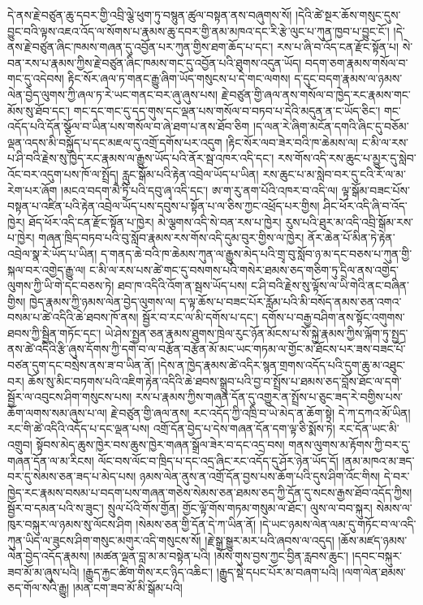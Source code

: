 \documentclass{article}
\begin{document}
དེ་ནས་རྗེ་བཙུན་ཆུ་དབར་གྱི་འབྲི་ལྕེ་ཕུག་ཏུ་བསྙུན་ཚུལ་བསྟན་ནས་བཞུགས་སོ། །དེའི་ཚེ་སྔར་ཆོས་གསུང་དུས་བྱུང་བའི་ལྟས་འཇའ་འོད་ལ་སོགས་པ་རྣམས་ཆུ་དབར་གྱི་ནམ་མཁའ་དང་རི་རྩེ་ལུང་པ་ཀུན་ཁྱབ་པ་བྱུང་ངོ་། །དེ་ནས་རྗེ་བཙུན་ཞིང་ཁམས་གཞན་དུ་འབྱོན་པར་ཀུན་གྱིས་ཐག་ཆོད་པ་དང་། རས་པ་ཞི་བ་འོད་ངན་རྫོང་སྟོན་པ། སེ་བན་རས་པ་རྣམས་ཀྱིས་རྗེ་བཙུན་ཞིང་ཁམས་གང་དུ་འབྱོན་པའི་ཐུགས་འདུན་ཡོད། བདག་ཅག་རྣམས་གསོལ་བ་གང་དུ་འདེབས། རྟིང་སོར་ཞལ་ཏ་གནང་རྒྱུ་ཞིག་ཡོད་གསུངས་པ་དེ་གང་ལགས། ད་དུང་བདག་རྣམས་ལ་ཉམས་ལེན་བྱེད་ལུགས་ཀྱི་ཞལ་ཏ་རེ་ཡང་གནང་བར་ཞུ་ཞུས་པས། རྗེ་བཙུན་གྱི་ཞལ་ནས་གསོལ་བ་ཁྱེད་རང་རྣམས་གང་མོས་སུ་ཐོབ་དང་། གང་དང་གང་དུ་དད་གུས་དང་ལྡན་པས་གསོལ་བ་བཏབ་པ་དེའི་མདུན་ན་ང་ཡོད་ཅིང་། གང་འདོད་པའི་དོན་སྩོལ་བ་ཡིན་པས་གསོལ་བ་ཞེ་ཐག་པ་ནས་ཐོབ་ཅིག །ད་ལན་རེ་ཞིག་མངོན་དགའི་ཞིང་དུ་བཅོམ་ལྡན་འདས་མི་བསྐྱོད་པ་དང་མཇལ་དུ་འགྲོ་དགོས་པར་འདུག །རྟིང་སོར་ལབ་ཟེར་བའི་ཁ་ཆེམས་ལ། ང་མི་ལ་རས་པ་ཤི་བའི་རྗེས་སུ་ཁྱེད་རང་རྣམས་ལ་རྒྱུས་ཡོད་པའི་ནོར་སྦ་འཁར་འདི་དང་། རས་གོས་འདི་རས་ཆུང་པ་མྱུར་དུ་སླེབ་འོང་བར་འདུག་པས་ཁོ་ལ་སྤྲོད། རླུང་སྒོམ་པའི་རྟེན་འབྲེལ་ཡོད་པ་ཡིན། རས་ཆུང་པ་མ་སླེབ་བར་དུ་ངའི་རོ་ལ་མ་རེག་པར་ཞོག །མངའ་བདག་མཻ་ཏྲི་པའི་དབུ་ཞྭ་འདི་དང་། ཨ་ག་རུ་ནག་པོའི་འཁར་བ་འདི་ལ། ལྟ་སྒོམ་བཟང་པོས་བསྟན་པ་འཛིན་པའི་རྟེན་འབྲེལ་ཡོད་པས་དབུས་པ་སྟོན་པ་ལ་ཅིས་ཀྱང་འཕྲོད་པར་གྱིས། ཤིང་ཕོར་འདི་ཞི་བ་འོད་ཁྱེར། ཐོད་ཕོར་འདི་ངན་རྫོང་སྟོན་པ་ཁྱེར། མེ་ལྕགས་འདི་སེ་བན་རས་པ་ཁྱེར། རུས་པའི་ཐུར་མ་འདི་འབྲི་སྒོམ་རས་པ་ཁྱེར། གཞན་ཁྲིད་བཏབ་པའི་བུ་སློབ་རྣམས་རས་གོས་འདི་དུམ་བུར་གྱིས་ལ་ཁྱེར། ནོར་ཆེན་པོ་མིན་ཏེ་རྟེན་འབྲེལ་སྣ་རེ་ཡོད་པ་ཡིན། ད་གནད་ཆེ་བའི་ཁ་ཆེམས་ཀུན་ལ་རྒྱུས་མེད་པའི་གྲྭ་བུ་སློབ་ཉ་མ་དང་བཅས་པ་ཀུན་གྱི་སྐལ་བར་འགྱེད་རྒྱུ་ལ། ང་མི་ལ་རས་པས་ཚེ་གང་དུ་བསགས་པའི་གསེར་ཐམས་ཅད་གཅིག་ཏུ་དྲིལ་ནས་འགྱེད་ལུགས་ཀྱི་ཡི་གེ་དང་བཅས་ཏེ། ཐབ་ཁ་འདིའི་འོག་ན་སྦས་ཡོད་པས། ང་ཤི་བའི་རྗེས་སུ་ལྟོས་ལ་ཡི་གེའི་ནང་བཞིན་གྱིས། ཁྱེད་རྣམས་ཀྱི་ཉམས་ལེན་བྱེད་ལུགས་ལ། ད་ལྟ་ཆོས་པ་བཟང་པོར་རློམ་པའི་མི་བསོད་ནམས་ཅན་འགའ་བསམ་པ་ཚེ་འདིའི་ཆེ་ཐབས་ཁོ་ནས། སྦྱོར་བ་རང་ལ་མི་དགོས་པ་དང་། དགོས་པ་བརྒྱ་བཤིག་ནས་སྟོང་འགུགས་ཐབས་ཀྱི་སྦྱིན་གཏོང་དང་། ཡེ་ཤེས་སྤྱན་ཅན་རྣམས་ཐུགས་ཁྲེལ་རུང་ཉོན་མོངས་པ་སོ་སྐྱེ་རྣམས་ཀྱིས་ལྐོག་ཏུ་སྤྱད་ནས་ཚེ་འདིའི་རྩི་ཞུས་དོགས་ཀྱི་དགེ་བ་ལ་བརྩོན་བརྩོན་མོ་མང་ཡང་གཏམ་ལ་གྱོང་མ་ཐོངས་པར་ཟས་བཟང་པོ་བཙན་དུག་དང་བསྲེས་ནས་ཟ་བ་ཡིན་ནོ། །དེས་ན་ཁྱེད་རྣམས་ཚེ་འདིར་སྙན་གྲགས་འདོད་པའི་དུག་ཆུ་མ་འཐུང་བར། ཆོས་སུ་མིང་བཏགས་པའི་འཇིག་རྟེན་འདིའི་ཆེ་ཐབས་སྒྲུབ་པའི་བྱ་བ་སྤྲོས་པ་ཐམས་ཅད་བློས་ཐོང་ལ་དགེ་སྦྱོར་ལ་འབུངས་ཤིག་གསུངས་པས། རས་པ་རྣམས་ཀྱིས་གཞན་དོན་དུ་འགྱུར་ན་སྤྲོས་པ་ཅུང་ཟད་རེ་བགྱིས་པས་ཆོག་ལགས་སམ་ཞུས་པ་ལ། རྗེ་བཙུན་གྱི་ཞལ་ནས། རང་འདོད་ཀྱི་འཁྲི་བ་ཡེ་མེད་ན་ཆོག་སྟེ། དེ་ཀ་དཀའ་མོ་ཡིན། རང་གི་ཚེ་འདིའི་འདོད་པ་དང་ལྡན་པས། འགྲོ་དོན་བྱེད་པ་དེས་གཞན་དོན་དག་ལྟ་ཅི་སྨོས་ཏེ། རང་དོན་ཡང་མི་འགྲུབ། སྟོབས་མེད་ཆུས་ཁྱེར་བས་ཆུས་ཁྱེར་གཞན་སྒྲོལ་ཟེར་བ་དང་འདྲ་བས། གནས་ལུགས་མ་རྟོགས་ཀྱི་བར་དུ་གཞན་དོན་ལ་མ་རིངས། ལོང་བས་ལོང་བ་ཁྲིད་པ་དང་འདྲ་ཞིང་རང་འདོད་དུ་ཤོར་ཉེན་ཡོད་དོ། །ནམ་མཁའ་མ་ཟད་བར་དུ་སེམས་ཅན་ཟད་པ་མེད་པས། ཉམས་ལེན་ནུས་ན་འགྲོ་དོན་བྱས་པས་ཆོག་པའི་དུས་ཤིག་འོང་གིས། དེ་བར་ཁྱེད་རང་རྣམས་བསམ་པ་བདག་པས་གཞན་གཅེས་སེམས་ཅན་ཐམས་ཅད་ཀྱི་དོན་དུ་སངས་རྒྱས་ཐོབ་འདོད་ཀྱིས། སྦྱོར་བ་དམན་པའི་ས་ཟུང་། སྲུལ་པོའི་གོས་གྱོན། གྱོང་ལྟོ་གོས་གཏམ་གསུམ་ལ་ཐོང་། ལུས་ལ་བབ་སྐུར། སེམས་ལ་ཁུར་བསྐུར་ལ་ཉམས་སུ་ལོངས་ཤིག །སེམས་ཅན་གྱི་དོན་དེ་ཀ་ཡིན་ནོ། །དེ་ཡང་ཉམས་ལེན་ལམ་དུ་གཏོང་བ་ལ་འདི་ཀུན་ཡིད་ལ་ཟུངས་ཤིག་གསུང་མགུར་འདི་གསུངས་སོ། །རྗེ་སྒྲ་སྒྱུར་མར་པའི་ཞབས་ལ་འདུད། །ཆོས་མཛད་ཉམས་ལེན་བྱེད་འདོད་རྣམས། །མཚན་ལྡན་བླ་མ་མ་བསྟེན་པའི། །མོས་གུས་བྱས་ཀྱང་བྱིན་རླབས་ཆུང་། །དབང་བསྐུར་ཟབ་མོ་མ་ཞུས་པའི། །རྒྱུད་རྐྱང་ཚིག་གིས་རང་ཉིད་འཆིང་། །རྒྱུད་སྡེ་དཔང་པོར་མ་བཞག་པའི། །ལག་ལེན་ཐམས་ཅད་གོལ་སའི་རྒྱུ། །མན་ངག་ཟབ་མོ་མི་སྒོམ་པའི། 
\end{document}
